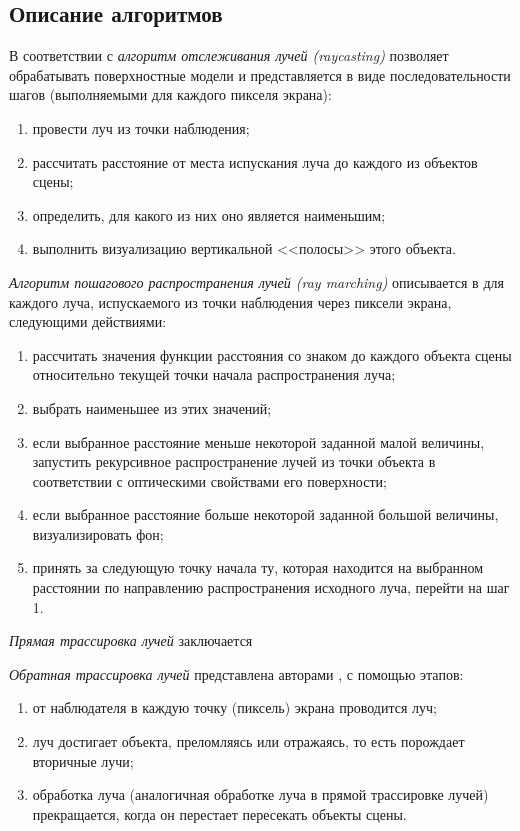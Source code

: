 \subsection{Описание алгоритмов}

В соответствии с \cite{евстратов2020создание} \textit{алгоритм отслеживания лучей (raycasting)} позволяет обрабатывать поверхностные модели и представляется в виде последовательности шагов (выполняемыми для каждого пикселя экрана):
\begin{enumerate}
	\item провести луч из точки наблюдения;
	\item рассчитать расстояние от места испускания луча до каждого из объектов сцены;
	\item определить, для какого из них оно является наименьшим;
	\item выполнить визуализацию вертикальной <<полосы>> этого объекта.
\end{enumerate}

\textit{Алгоритм пошагового распространения лучей (ray marching)} описывается в \cite{bredenbals2022visualising} для каждого луча, испускаемого из точки наблюдения через пиксели экрана, следующими действиями:
\begin{enumerate}
	\item рассчитать значения функции расстояния со знаком до каждого объекта сцены относительно текущей точки начала распространения луча;
	\item выбрать наименьшее из этих значений;
	\item если выбранное расстояние меньше некоторой заданной малой величины, запустить рекурсивное распространение лучей из точки объекта в соответствии с оптическими свойствами его поверхности;
	\item если выбранное расстояние больше некоторой заданной большой величины, визуализировать фон;
	\item принять за следующую точку начала ту, которая находится на выбранном расстоянии по направлению распространения исходного луча, перейти на шаг 1.
\end{enumerate}

\textit{Прямая трассировка лучей} заключается 

\textit{Обратная трассировка лучей} представлена авторами \cite{порев2002компьютерная}, \cite{демин2011} с помощью этапов:
\begin{enumerate}
	\item от наблюдателя в каждую точку (пиксель) экрана проводится луч;
	\item луч достигает объекта, преломляясь или отражаясь, то есть порождает вторичные лучи;
	\item обработка луча (аналогичная обработке луча в прямой трассировке лучей) прекращается, когда он перестает пересекать объекты сцены.
\end{enumerate}

